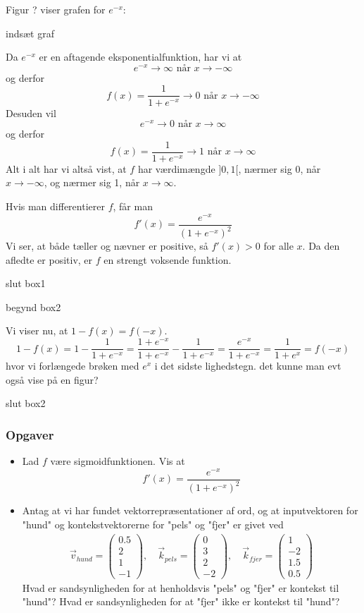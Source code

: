 \documentclass{article}
\newcommand{\am}[1]{{\color{red} #1}}
\begin{document}
Figur ? viser grafen for $e^{-x}$:

\am{indsæt graf}

Da $e^{-x}$ er en aftagende eksponentialfunktion, har vi at 
$$e^{-x} \to \infty \text{ når } x\to -\infty$$
og derfor
$$f(x)=\frac{1}{1+e^{-x}}\to 0 \text{ når } x\to -\infty$$
Desuden vil
$$e^{-x} \to 0 \text{ når } x\to \infty$$
og derfor
$$f(x)=\frac{1}{1+e^{-x}}\to 1 \text{ når } x\to \infty$$
Alt i alt har vi altså vist, at $f$ har værdimængde $]0,1[$, nærmer sig 0, når $x\to -\infty$, og nærmer sig 1, når $x\to \infty$. 

Hvis man differentierer $f$, får man
$$f'(x)=\frac{e^{-x}}{(1+e^{-x})^2}$$
Vi ser, at både tæller og nævner er positive, så $f'(x)>0$ for alle $x$. Da den afledte er positiv, er $f$ en strengt voksende funktion. 

\am{slut box1}

\am{begynd box2}

Vi viser nu, at $1-f(x) = f(-x)$.
\begin{equation}\label{eq:1-f}
1-f(x) = 1-\frac{1}{1+e^{-x}} = \frac{1+e^{-x}}{1+e^{-x}}-\frac{1}{1+e^{-x}}=\frac{e^{-x}}{1+e^{-x}}=\frac{1}{1+e^{x}} =f(-x)
\end{equation}
hvor vi forlængede brøken med $e^x$ i det sidste lighedstegn.
\am{det kunne man evt også vise på en figur?}

\am{slut box2}


\subsubsection*{Opgaver}
\begin{itemize}
\item Lad $f$ være sigmoidfunktionen. Vis at
$$f'(x)=\frac{e^{-x}}{(1+e^{-x})^2}$$
\item Antag at vi har fundet vektorrepræsentationer af ord, og at inputvektoren for "hund"  og kontekstvektorerne for "pels" og "fjer" er givet ved
\begin{align*}
\overrightarrow{v}_{hund}=\begin{pmatrix} 0.5\\2\\1\\-1\end{pmatrix} ,\quad
\overrightarrow{k}_{pels}=\begin{pmatrix} 0\\3\\2\\-2\end{pmatrix},\quad
\overrightarrow{k}_{fjer}=\begin{pmatrix} 1\\-2\\1.5\\0.5\end{pmatrix}
\end{align*}
Hvad er sandsynligheden for at henholdsvis "pels" og "fjer" er kontekst til "hund"? Hvad er sandsynligheden for at "fjer" ikke er kontekst til "hund"?
\end{itemize}
\end{document}
